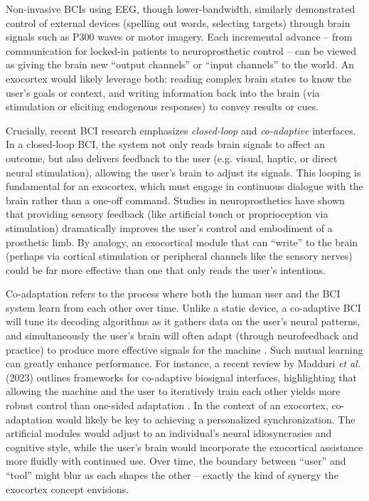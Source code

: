 \documentclass[11pt]{article}
\newcommand{\quotes}[1]{``#1''}
\begin{document}
Non-invasive BCIs using EEG, though lower-bandwidth, similarly demonstrated control of external devices (spelling out words, selecting targets) through brain signals such as P300 waves or motor imagery. Each incremental advance -- from communication for locked-in patients to neuroprosthetic control -- can be viewed as giving the brain new \quotes{output channels} or \quotes{input channels} to the world. An exocortex would likely leverage both: reading complex brain states to know the user's goals or context, and writing information back into the brain (via stimulation or eliciting endogenous responses) to convey results or cues.

Crucially, recent BCI research emphasizes \textit{closed-loop} and \textit{co-adaptive} interfaces. In a closed-loop BCI, the system not only reads brain signals to affect an outcome, but also delivers feedback to the user (e.g. visual, haptic, or direct neural stimulation), allowing the user's brain to adjust its signals. This looping is fundamental for an exocortex, which must engage in continuous dialogue with the brain rather than a one-off command. Studies in neuroprosthetics have shown that providing sensory feedback (like artificial touch or proprioception via stimulation) dramatically improves the user's control and embodiment of a prosthetic limb. By analogy, an exocortical module that can \quotes{write} to the brain (perhaps via cortical stimulation or peripheral channels like the sensory nerves) could be far more effective than one that only reads the user's intentions.

Co-adaptation refers to the process where both the human user and the BCI system learn from each other over time. Unlike a static device, a co-adaptive BCI will tune its decoding algorithms as it gathers data on the user's neural patterns, and simultaneously the user's brain will often adapt (through neurofeedback and practice) to produce more effective signals for the machine \cite{Singh2017}. Such mutual learning can greatly enhance performance. For instance, a recent review by Madduri \textit{et al.} (2023) outlines frameworks for co-adaptive biosignal interfaces, highlighting that allowing the machine and the user to iteratively train each other yields more robust control than one-sided adaptation \cite{Madduri2023}. In the context of an exocortex, co-adaptation would likely be key to achieving a personalized synchronization. The artificial modules would adjust to an individual's neural idiosyncrasies and cognitive style, while the user's brain would incorporate the exocortical assistance more fluidly with continued use. Over time, the boundary between \quotes{user} and \quotes{tool} might blur as each shapes the other -- exactly the kind of synergy the exocortex concept envisions.
\end{document}
